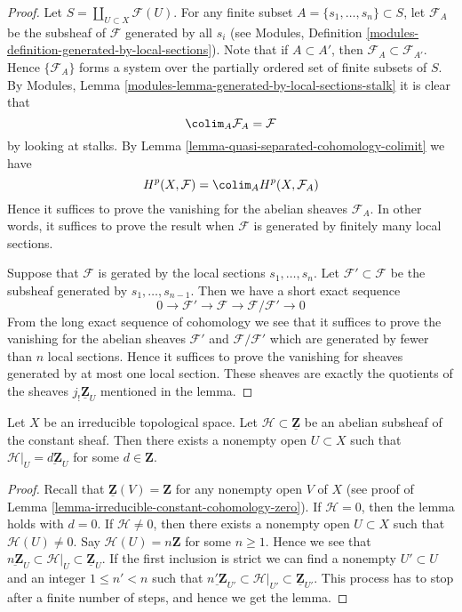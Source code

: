 \begin{proof}
Let $S = \coprod_{U \subset X} \mathcal{F}(U)$.
For any finite subset $A = \{s_1, \ldots, s_n\} \subset S$,
let $\mathcal{F}_A$ be the subsheaf of $\mathcal{F}$ generated
by all $s_i$ (see
Modules, Definition \ref{modules-definition-generated-by-local-sections}).
Note that if $A \subset A'$, then $\mathcal{F}_A \subset \mathcal{F}_{A'}$.
Hence $\{\mathcal{F}_A\}$ forms a system over the partially ordered
set of finite subsets of $S$.
By Modules, Lemma \ref{modules-lemma-generated-by-local-sections-stalk}
it is clear that
$$
\colim_A \mathcal{F}_A = \mathcal{F}
$$
by looking at stalks. By
Lemma \ref{lemma-quasi-separated-cohomology-colimit} we have
$$
H^p(X, \mathcal{F}) =
\colim_A H^p(X, \mathcal{F}_A)
$$
Hence it suffices to prove the vanishing for the abelian sheaves
$\mathcal{F}_A$. In other words, it suffices to prove the
result when $\mathcal{F}$ is generated by finitely many local sections.

\medskip\noindent
Suppose that $\mathcal{F}$ is gerated by the local sections
$s_1, \ldots, s_n$. Let $\mathcal{F}' \subset \mathcal{F}$
be the subsheaf generated by $s_1, \ldots, s_{n - 1}$.
Then we have a short exact sequence
$$
0 \to \mathcal{F}' \to \mathcal{F} \to \mathcal{F}/\mathcal{F}' \to 0
$$
From the long exact sequence of cohomology we see that it suffices
to prove the vanishing for the abelian sheaves $\mathcal{F}'$
and $\mathcal{F}/\mathcal{F}'$ which are generated by fewer than
$n$ local sections. Hence it suffices to prove the vanishing
for sheaves generated by at most one local section. These sheaves
are exactly the quotients of the sheaves $j_{!}\underline{\mathbf{Z}}_U$
mentioned in the lemma.
\end{proof}

\begin{lemma}
\label{lemma-subsheaf-irreducible}
Let $X$ be an irreducible topological space.
Let $\mathcal{H} \subset \underline{\mathbf{Z}}$ be
an abelian subsheaf of the constant sheaf.
Then there exists a nonempty open $U \subset X$ such
that $\mathcal{H}|_U = \underline{d\mathbf{Z}}_U$
for some $d \in \mathbf{Z}$.
\end{lemma}

\begin{proof}
Recall that $\underline{\mathbf{Z}}(V) = \mathbf{Z}$
for any nonempty open $V$ of $X$ (see proof of
Lemma \ref{lemma-irreducible-constant-cohomology-zero}).
If $\mathcal{H} = 0$, then the lemma holds with $d = 0$.
If $\mathcal{H} \not = 0$, then there exists a nonempty open
$U \subset X$ such that $\mathcal{H}(U) \not = 0$.
Say $\mathcal{H}(U) = n\mathbf{Z}$ for some $n \geq 1$.
Hence we see that
$\underline{n\mathbf{Z}}_U
\subset \mathcal{H}|_U \subset
\underline{\mathbf{Z}}_U$. If the first inclusion is strict we
can find a nonempty $U' \subset U$ and an integer $1 \leq n' < n$
such that
$\underline{n'\mathbf{Z}}_{U'}
\subset \mathcal{H}|_{U'} \subset
\underline{\mathbf{Z}}_{U'}$.
This process has to stop after a finite number of steps, and
hence we get the lemma.
\end{proof}


